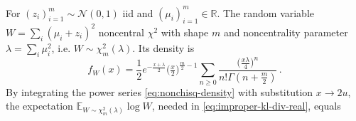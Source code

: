 \documentclass[a4paper,10pt]{article}
\begin{document}
For $(z_i)_{i=1}^m \sim \mathcal{N}(0, 1)$ iid and $
  (\mu_i)_{i=1}^m \in \mathbb{R}
$. The random variable $W = \sum_i (\mu_i + z_i)^2$ noncentral $\chi^2$ with shape $m$
and noncentrality parameter $\lambda = \sum_i \mu_i^2$, i.e. $W\sim \chi^2_m(\lambda)$.
Its density is
\begin{equation}  \label{eq:nonchisq-density}
  f_W(x)
    = \frac12 e^{- \tfrac{x + \lambda}2} \bigl(\tfrac{x}2\bigr)^{\tfrac{m}2 - 1}
      \sum_{n \geq 0} \frac{
        \bigl(\tfrac{x \lambda}4\bigr)^n
      }{
        n! \Gamma(n + \tfrac{m}2)
      }
    \,.
\end{equation}
By integrating the power series \eqref{eq:nonchisq-density} with substitution $x \to 2u$,
the expectation $
  \mathbb{E}_{W\sim \chi^2_m(\lambda)} \log W
$, needed in \eqref{eq:improper-kl-div-real}, equals
\end{document}

